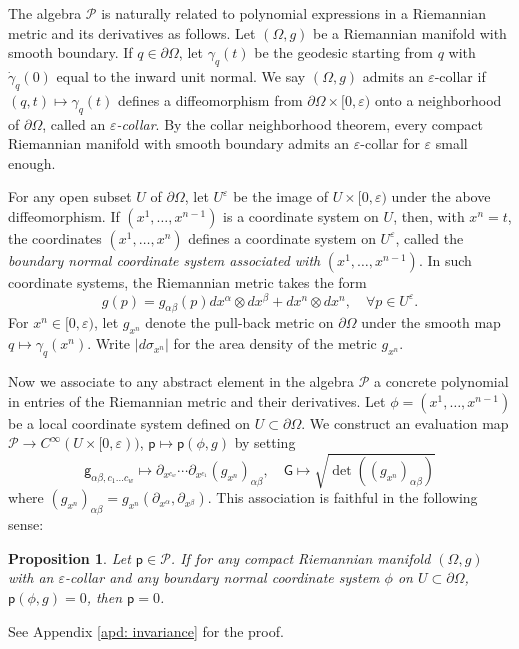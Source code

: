 \documentclass[11pt]{amsart}
\newtheorem{proposition}[theorem]{Proposition}
\theoremstyle{definition}
\numberwithin{equation}{section}
\begin{document}
The algebra $\mathcal P$ is naturally related to polynomial expressions in a Riemannian metric and its derivatives as follows. Let $(\Omega,g)$ be a Riemannian manifold with smooth boundary. If $q\in\partial\Omega$, let $\gamma_q(t)$ be the geodesic starting from $q$ with $\dot\gamma_q(0)$ equal to the inward unit normal. We say $(\Omega,g)$ admits an $\varepsilon$-collar if $(q,t) \mapsto \gamma_q(t)$ defines a diffeomorphism from $\partial\Omega\times[0,\varepsilon)$ onto a neighborhood of $\partial\Omega$, called an  {\em $\varepsilon$-collar}. By the collar neighborhood theorem, every compact Riemannian manifold with smooth boundary admits an $\varepsilon$-collar for $\varepsilon$ small enough.

For any open subset $U$ of $\partial\Omega$, let $U^\varepsilon$ be the image of $U\times[0,\varepsilon)$ under the above diffeomorphism. If $(x^1,\dots,x^{n-1})$ is a coordinate system on $U$, then, with $x^n=t$, the coordinates $(x^1,\dots,x^n)$ defines a coordinate system on $U^\varepsilon$, called the {\em boundary normal coordinate system associated with} $(x^1,\dots, x^{n-1})$. In such coordinate systems, the Riemannian metric takes the form
\begin{equation*}%
    g(p) = g_{\alpha\beta}(p)dx^\alpha\otimes dx^\beta + dx^n\otimes dx^n,\quad\forall p\in U^\varepsilon.
\end{equation*}
For $x^n\in[0,\varepsilon)$, let $g_{x^n}$ denote the pull-back metric on $\partial\Omega$ under the smooth map $q\mapsto\gamma_q(x^n)$. Write $|d\sigma_{x^n}|$ for the area density of the metric $g_{x^n}$.

Now we associate to any abstract element in the algebra $\mathcal P$ a concrete polynomial in entries of the Riemannian metric and their derivatives.  
Let $\phi = (x^1,\dots,x^{n-1})$ be a local coordinate system defined on $U\subset\partial\Omega$. We construct an evaluation map $\mathcal P\to C^\infty(U\times[0,\varepsilon))$, $\mathsf p\mapsto\mathsf p(\phi,g)$ by setting
\[\mathsf g_{\alpha\beta,c_1\dots c_w} \mapsto \partial_{x^{c_w}}\cdots\partial_{x^{c_1}}(g_{x^n})_{\alpha\beta},\quad\mathsf G\mapsto\sqrt{\det((g_{x^n})_{\alpha\beta})}\] 
where $(g_{x^n})_{\alpha\beta} = g_{x^n}(\partial_{x^\alpha},\partial_{x^\beta})$.  
This association is faithful in the following sense:
\begin{proposition}\label{prop: faithful}
	Let $\mathsf p\in\mathcal P$. If for any compact Riemannian manifold $(\Omega,g)$  with an $\varepsilon$-collar and any boundary normal coordinate system $\phi$ on $U \subset \partial \Omega$,  $\mathsf p(\phi,g) = 0$, then $\mathsf p = 0$.
\end{proposition}
See Appendix \ref{apd: invariance} for the proof.
\end{document}
